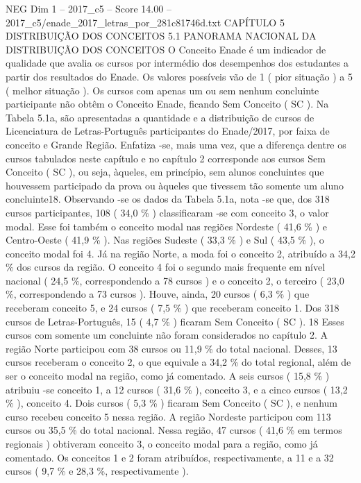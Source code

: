 \begin{textsample}{NEG Dim 1 – 2017\_c5 – Score 14.00 – 2017\_c5/enade\_2017\_letras\_por\_281c81746d.txt}  \label{ex:f1_neg_390}
CAPÍTULO 5 DISTRIBUIÇÃO DOS CONCEITOS 5.1 PANORAMA NACIONAL DA DISTRIBUIÇÃO DOS CONCEITOS O Conceito Enade é um indicador de qualidade que avalia os cursos por intermédio dos desempenhos dos estudantes a partir dos resultados do Enade.
Os valores possíveis vão de 1 ( pior situação ) a 5 ( melhor situação ).
Os cursos com apenas um ou sem nenhum concluinte participante não obtêm o Conceito Enade, ficando Sem Conceito ( SC ).
Na Tabela 5.1a, são apresentadas a quantidade e a distribuição de cursos de Licenciatura de Letras-Português participantes do Enade/2017, por faixa de conceito e Grande Região.
Enfatiza -se, mais uma vez, que a diferença dentre os cursos tabulados neste capítulo e no capítulo 2 corresponde aos cursos Sem Conceito ( SC ), ou seja, àqueles, em princípio, sem alunos concluintes que houvessem participado da prova ou àqueles que tivessem tão somente um aluno concluinte18.
Observando -se os dados da Tabela 5.1a, nota -se que, dos 318 cursos participantes, 108 ( 34,0 \% ) classificaram -se com conceito 3, o valor modal.
Esse foi também o conceito modal nas regiões Nordeste ( 41,6 \% ) e Centro-Oeste ( 41,9 \% ).
Nas regiões Sudeste ( 33,3 \% ) e Sul ( 43,5 \% ), o conceito modal foi 4.
Já na região Norte, a moda foi o conceito 2, atribuído a 34,2 \% dos cursos da região.
O conceito 4 foi o segundo mais frequente em nível nacional ( 24,5 \%, correspondendo a 78 cursos ) e o conceito 2, o terceiro ( 23,0 \%, correspondendo a 73 cursos ).
Houve, ainda, 20 cursos ( 6,3 \% ) que receberam conceito 5, e 24 cursos ( 7,5 \% ) que receberam conceito 1.
Dos 318 cursos de Letras-Português, 15 ( 4,7 \% ) ficaram Sem Conceito ( SC ). 18 Esses cursos com somente um concluinte não foram considerados no capítulo 2.
A região Norte participou com 38 cursos ou 11,9 \% do total nacional.
Desses, 13 cursos receberam o conceito 2, o que equivale a 34,2 \% do total regional, além de ser o conceito modal na região, como já comentado.
A seis cursos ( 15,8 \% ) atribuiu -se conceito 1, a 12 cursos ( 31,6 \% ), conceito 3, e a cinco cursos ( 13,2 \% ), conceito 4.
Dois cursos ( 5,3 \% ) ficaram Sem Conceito ( SC ), e nenhum curso recebeu conceito 5 nessa região.
A região Nordeste participou com 113 cursos ou 35,5 \% do total nacional.
Nessa região, 47 cursos ( 41,6 \% em termos regionais ) obtiveram conceito 3, o conceito modal para a região, como já comentado.
Os conceitos 1 e 2 foram atribuídos, respectivamente, a 11 e a 32 cursos ( 9,7 \% e 28,3 \%, respectivamente ).

\end{textsample}
